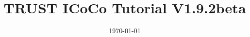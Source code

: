 \documentclass[10pt, hyperref={unicode=true,pdfusetitle, bookmarks=true,bookmarksnumbered=false,bookmarksopen=false, breaklinks=false,pdfborder={0 0 1},backref=true,colorlinks=true,linkcolor=darkblue,pageanchor, urlcolor=darkblue}]{beamer}
\title[TRUST ICoCo Tutorial V1.9.2beta]{TRUST ICoCo Tutorial V1.9.2beta}
\institute[CEA/DES/ISAS/DM2S/STMF] %
{
CEA Saclay \\ %
\medskip
\textit{Support team: trust@cea.fr} %
\medskip
}
\date{\today} %
\begin{document}
\begin{frame}
\titlepage %
\end{frame}

\begin{frame}
\tableofcontents [hideallsubsections]
\end{frame}
\end{document}

